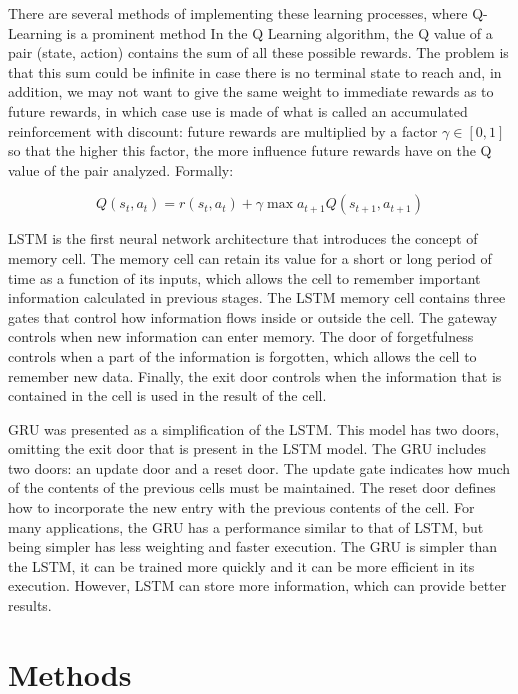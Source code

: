 \documentclass[conference]{IEEEtran}
\begin{document}
There are several methods of implementing these learning processes, where Q-Learning is a prominent method
In the Q Learning algorithm, the Q value of a pair (state, action) contains the sum of all these possible rewards. The problem is that this sum could be infinite in case there is no terminal state to reach and, in addition, we may not want to give the same weight to immediate rewards as to future rewards, in which case use is made of what is called an accumulated reinforcement with discount: future rewards are multiplied by a factor $\gamma \in [0,1] $ so that the higher this factor, the more influence future rewards have on the Q value of the pair analyzed. Formally:

\begin{equation}
    Q(s_t,a_t)=r(s_t,a_t) + \gamma \max a_{t+1}Q(s_{t+1},a_{t+1})
\end{equation}



LSTM is the first neural network architecture that introduces the concept of memory cell.
The memory cell can retain its value for a short or long period of time as a function of its inputs, which allows the cell to remember important information calculated in previous stages.
The LSTM memory cell contains three gates that control how information flows inside or outside the cell. The gateway controls when new information can enter memory. The door of forgetfulness controls when a part of the information is forgotten, which allows the cell to remember new data. Finally, the exit door controls when the information that is contained in the cell is used in the result of the cell.

GRU was presented as a simplification of the LSTM.
This model has two doors, omitting the exit door that is present in the LSTM model.
The GRU includes two doors: an update door and a reset door. The update gate indicates how much of the contents of the previous cells must be maintained. The reset door defines how to incorporate the new entry with the previous contents of the cell.
For many applications, the GRU has a performance similar to that of LSTM, but being simpler has less weighting and faster execution.
The GRU is simpler than the LSTM, it can be trained more quickly and it can be more efficient in its execution. However, LSTM can store more information, which can provide better results.



\section{Methods}
\end{document}
